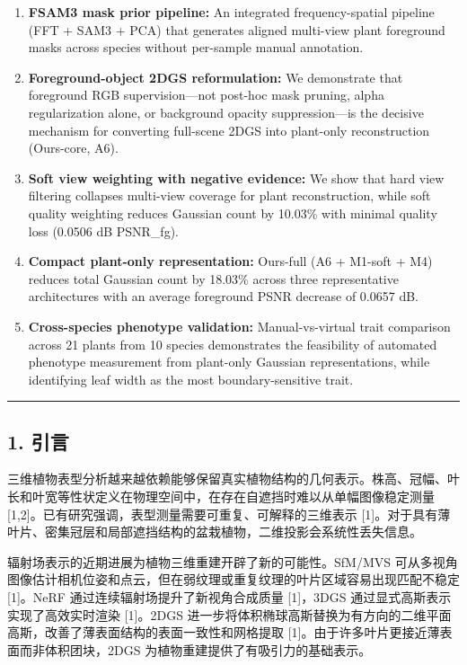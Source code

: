 \documentclass[11pt,a4paper]{article}
\begin{document}
\begin{enumerate}
\def\labelenumi{\arabic{enumi}.}
\item
  \textbf{FSAM3 mask prior pipeline:} An integrated frequency-spatial
  pipeline (FFT + SAM3 + PCA) that generates aligned multi-view plant
  foreground masks across species without per-sample manual annotation.
\item
  \textbf{Foreground-object 2DGS reformulation:} We demonstrate that
  foreground RGB supervision---not post-hoc mask pruning, alpha
  regularization alone, or background opacity suppression---is the
  decisive mechanism for converting full-scene 2DGS into plant-only
  reconstruction (Ours-core, A6).
\item
  \textbf{Soft view weighting with negative evidence:} We show that hard
  view filtering collapses multi-view coverage for plant reconstruction,
  while soft quality weighting reduces Gaussian count by 10.03\% with
  minimal quality loss (0.0506 dB PSNR\_fg).
\item
  \textbf{Compact plant-only representation:} Ours-full (A6 + M1-soft +
  M4) reduces total Gaussian count by 18.03\% across three
  representative architectures with an average foreground PSNR decrease
  of 0.0657 dB.
\item
  \textbf{Cross-species phenotype validation:} Manual-vs-virtual trait
  comparison across 21 plants from 10 species demonstrates the
  feasibility of automated phenotype measurement from plant-only
  Gaussian representations, while identifying leaf width as the most
  boundary-sensitive trait.
\end{enumerate}

\begin{center}\rule{0.5\linewidth}{0.5pt}\end{center}

\subsection{1. 引言}\label{ux5f15ux8a00}

三维植物表型分析越来越依赖能够保留真实植物结构的几何表示。株高、冠幅、叶长和叶宽等性状定义在物理空间中，在存在自遮挡时难以从单幅图像稳定测量
{[}1,2{]}。已有研究强调，表型测量需要可重复、可解释的三维表示
{[}1{]}。对于具有薄叶片、密集冠层和局部遮挡结构的盆栽植物，二维投影会系统性丢失信息。

辐射场表示的近期进展为植物三维重建开辟了新的可能性。SfM/MVS
可从多视角图像估计相机位姿和点云，但在弱纹理或重复纹理的叶片区域容易出现匹配不稳定
{[}1{]}。NeRF 通过连续辐射场提升了新视角合成质量 {[}1{]}，3DGS
通过显式高斯表示实现了高效实时渲染 {[}1{]}。2DGS
进一步将体积椭球高斯替换为有方向的二维平面高斯，改善了薄表面结构的表面一致性和网格提取
{[}1{]}。由于许多叶片更接近薄表面而非体积团块，2DGS
为植物重建提供了有吸引力的基础表示。
\end{document}
